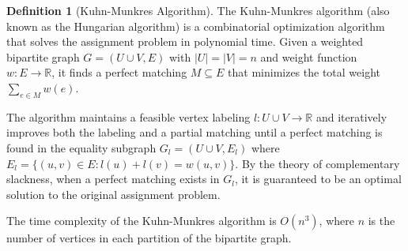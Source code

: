 \documentclass{article}
\theoremstyle{definition}
\newtheorem{definition}{Definition}
\begin{document}
\begin{definition}[Kuhn-Munkres Algorithm]
The Kuhn-Munkres algorithm (also known as the Hungarian algorithm) is a combinatorial optimization algorithm that solves the assignment problem in polynomial time. Given a weighted bipartite graph $G = (U \cup V, E)$ with $|U| = |V| = n$ and weight function $w: E \rightarrow \mathbb{R}$, it finds a perfect matching $M \subseteq E$ that minimizes the total weight $\sum_{e \in M} w(e)$. 

The algorithm maintains a feasible vertex labeling $l: U \cup V \rightarrow \mathbb{R}$ and iteratively improves both the labeling and a partial matching until a perfect matching is found in the equality subgraph $G_l = (U \cup V, E_l)$ where $E_l = \{(u,v) \in E : l(u) + l(v) = w(u,v)\}$. By the theory of complementary slackness, when a perfect matching exists in $G_l$, it is guaranteed to be an optimal solution to the original assignment problem.

The time complexity of the Kuhn-Munkres algorithm is $O(n^3)$, where $n$ is the number of vertices in each partition of the bipartite graph.
\end{definition}
\end{document}
